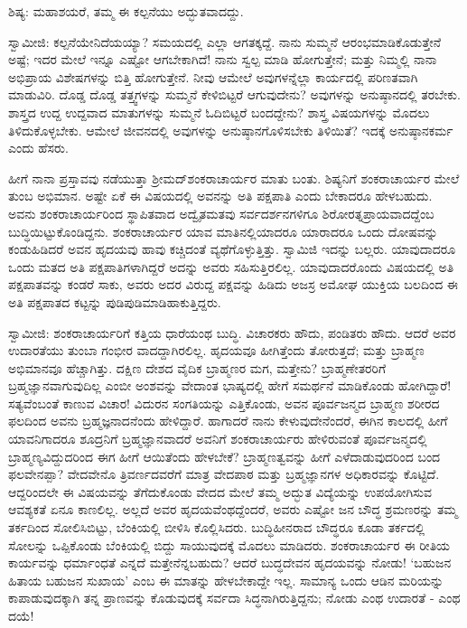ಶಿಷ್ಯ: ಮಹಾಶಯರೆ, ತಮ್ಮ ಈ ಕಲ್ಪನೆಯು ಅದ್ಭುತವಾದದ್ದು.

ಸ್ವಾಮೀಜಿ: ಕಲ್ಪನೆಯೇನಿದೆಯಯ್ಯಾ? ಸಮಯದಲ್ಲಿ ಎಲ್ಲಾ ಆಗತಕ್ಕದ್ದೆ. ನಾನು ಸುಮ್ಮನೆ ಆರಂಭಮಾಡಿಕೊಡುತ್ತೇನೆ ಅಷ್ಟೆ; ಇದರ ಮೇಲೆ ಇನ್ನೂ ಎಷ್ಟೋ ಆಗಬೇಕಾಗಿದೆ! ನಾನು ಸ್ವಲ್ಪ ಮಾಡಿ ಹೋಗುತ್ತೇನೆ; ಮತ್ತು ನಿಮ್ಮಲ್ಲಿ ನಾನಾ ಅಭಿಪ್ರಾಯ ವಿಶೇಷಗಳನ್ನು ಬಿತ್ತಿ ಹೋಗುತ್ತೇನೆ. ನೀವು ಆಮೇಲೆ ಅವುಗಳನ್ನೆಲ್ಲಾ ಕಾರ್ಯದಲ್ಲಿ ಪರಿಣತವಾಗಿ ಮಾಡುವಿರಿ. ದೊಡ್ಡ ದೊಡ್ಡ ತತ್ತ್ವಗಳನ್ನು ಸುಮ್ಮನೆ ಕೇಳಿಬಿಟ್ಟರೆ ಆಗುವುದೇನು? ಅವುಗಳನ್ನು ಅನುಷ್ಠಾನದಲ್ಲಿ ತರಬೇಕು. ಶಾಸ್ತ್ರದ ಉದ್ದ ಉದ್ದವಾದ ಮಾತುಗಳನ್ನು ಸುಮ್ಮನೆ ಓದಿಬಿಟ್ಟರೆ ಬಂದದ್ದೇನು? ಶಾಸ್ತ್ರ ವಿಷಯಗಳನ್ನು ಮೊದಲು ತಿಳಿದುಕೊಳ್ಳಬೇಕು. ಆಮೇಲೆ ಜೀವನದಲ್ಲಿ ಅವುಗಳನ್ನು ಅನುಷ್ಠಾನಗೊಳಿಸಬೇಕು ತಿಳಿಯಿತೆ? ಇದಕ್ಕೆ ಅನುಷ್ಠಾನಕರ್ಮ ಎಂದು ಹೆಸರು.

ಹೀಗೆ ನಾನಾ ಪ್ರಸ್ತಾವವು ನಡೆಯುತ್ತಾ ಶ‍್ರೀಮದ್‌ಶಂಕರಾಚಾರ್ಯರ ಮಾತು ಬಂತು. ಶಿಷ್ಯನಿಗೆ ಶಂಕರಾಚಾರ್ಯರ ಮೇಲೆ ತುಂಬ ಅಭಿಮಾನ. ಅಷ್ಟೇ ಏಕೆ ಈ ವಿಷಯದಲ್ಲಿ ಅವನನ್ನು ಅತಿ ಪಕ್ಷಪಾತಿ ಎಂದು ಬೇಕಾದರೂ ಹೇಳಬಹುದು. ಅವನು ಶಂಕರಾಚಾರ್ಯರಿಂದ ಸ್ಥಾಪಿತವಾದ ಅದ್ವೈತಮತವು ಸರ್ವದರ್ಶನಗಳಿಗೂ ಶಿರೋರತ್ನಪ್ರಾಯವಾದದ್ದೆಂಬ ಬುದ್ಧಿಯಿಟ್ಟುಕೊಂಡಿದ್ದನು. ಶಂಕರಾಚಾರ್ಯರ ಯಾವ ಮಾತಿನಲ್ಲಿಯಾದರೂ ಯಾರಾದರೂ ಒಂದು ದೋಷವನ್ನು ಕಂಡುಹಿಡಿದರೆ ಅವನ ಹೃದಯವು ಹಾವು ಕಚ್ಚಿದಂತೆ ವ್ಯಥೆಗೊಳ್ಳುತ್ತಿತ್ತು. ಸ್ವಾಮಿಜಿ ಇದನ್ನು ಬಲ್ಲರು. ಯಾವುದಾದರೂ ಒಂದು ಮತದ ಅತಿ ಪಕ್ಷಪಾತಿಗಳಾಗಿದ್ದರೆ ಅದನ್ನು ಅವರು ಸಹಿಸುತ್ತಿರಲಿಲ್ಲ. ಯಾವುದಾದರೊಂದು ವಿಷಯದಲ್ಲಿ ಅತಿ ಪಕ್ಷಪಾತವನ್ನು ಕಂಡರೆ ಸಾಕು, ಅವರು ಅದರ ವಿರುದ್ದ ಪಕ್ಷವನ್ನು ಹಿಡಿದು ಅಜಸ್ರ ಅಮೋಘ ಯುಕ್ತಿಯ ಬಲದಿಂದ ಈ ಅತಿ ಪಕ್ಷಪಾತದ ಕಟ್ಟನ್ನು ಪುಡಿಪುಡಿಮಾಡಿಹಾಕುತ್ತಿದ್ದರು.

ಸ್ವಾಮೀಜಿ: ಶಂಕರಾಚಾರ್ಯರಿಗೆ ಕತ್ತಿಯ ಧಾರೆಯಂಥ ಬುದ್ಧಿ. ವಿಚಾರಕರು ಹೌದು, ಪಂಡಿತರು ಹೌದು. ಆದರೆ ಅವರ ಉದಾರತೆಯು ತುಂಬಾ ಗಂಭೀರ ವಾದದ್ದಾಗಿರಲಿಲ್ಲ. ಹೃದಯವೂ ಹೀಗಿತ್ತೆಂದು ತೋರುತ್ತದೆ; ಮತ್ತು ಬ್ರಾಹ್ಮಣ ಅಭಿಮಾನವೂ ಹೆಚ್ಚಾಗಿತ್ತು. ದಕ್ಷಿಣ ದೇಶದ ವೈದಿಕ ಬ್ರಾಹ್ಮಣರ ಮಗ, ಮತ್ತೇನು? ಬ್ರಾಹ್ಮಣೇತರರಿಗೆ ಬ್ರಹ್ಮಜ್ಞಾನವಾಗುವುದಿಲ್ಲ ಎಂಬೀ ಅಂಶವನ್ನು ವೇದಾಂತ ಭಾಷ್ಯದಲ್ಲಿ ಹೇಗೆ ಸಮರ್ಥನೆ ಮಾಡಿಕೊಂಡು ಹೋಗಿದ್ದಾರೆ! ಸತ್ಯವೆಂಬಂತೆ ಕಾಣುವ ವಿಚಾರ! ವಿದುರನ ಸಂಗತಿಯನ್ನು ಎತ್ತಿಕೊಂಡು, ಅವನ ಪೂರ್ವಜನ್ಮದ ಬ್ರಾಹ್ಮಣ ಶರೀರದ ಫಲದಿಂದ ಅವನು ಬ್ರಹ್ಮಜ್ಞನಾದನೆಂದು ಹೇಳಿದ್ದಾರೆ. ಹಾಗಾದರೆ ನಾನು ಕೇಳುವುದೇನೆಂದರೆ, ಈಗಿನ ಕಾಲದಲ್ಲಿ ಹೀಗೆ ಯಾವನಿಗಾದರೂ ಶೂದ್ರನಿಗೆ ಬ್ರಹ್ಮಜ್ಞಾನವಾದರೆ ಅವನಿಗೆ ಶಂಕರಾಚಾರ್ಯರು ಹೇಳಿರುವಂತೆ ಪೂರ್ವಜನ್ಮದಲ್ಲಿ ಬ್ರಾಹ್ಮಣ್ಯವಿದ್ದುದರಿಂದ ಈಗ ಹೀಗೆ ಆಯಿತೆಂದು ಹೇಳಬೇಕೆ? ಬ್ರಾಹ್ಮಣತ್ವವನ್ನು ಹೀಗೆ ಎಳೆದಾಡುವುದರಿಂದ ಬಂದ ಫಲವೇನಪ್ಪಾ? ವೇದವೇನೊ ತ್ರಿವರ್ಣದವರೆಗೆ ಮಾತ್ರ ವೇದಪಾಠ ಮತ್ತು ಬ್ರಹ್ಮಜ್ಞಾನಗಳ ಅಧಿಕಾರವನ್ನು ಕೊಟ್ಟಿದೆ. ಆದ್ದರಿಂದಲೇ ಈ ವಿಷಯವನ್ನು ತೆಗೆದುಕೊಂಡು ವೇದದ ಮೇಲೆ ತಮ್ಮ ಅದ್ಭುತ ವಿದ್ಯೆಯನ್ನು ಉಪಯೋಗಿಸುವ ಆವಶ್ಯಕತೆ ಏನೂ ಕಾಣಲಿಲ್ಲ. ಅಲ್ಲದೆ ಅವರ ಹೃದಯವೆಂಥದ್ದೆಂದರೆ, ಅವರು ಎಷ್ಟೋ ಜನ ಬೌದ್ಧ ಶ್ರಮಣರನ್ನು ತಮ್ಮ ತರ್ಕದಿಂದ ಸೋಲಿಸಿಬಿಟ್ಟು, ಬೆಂಕಿಯಲ್ಲಿ ಬೀಳಿಸಿ ಕೊಲ್ಲಿಸಿದರು. ಬುದ್ಧಿಹೀನರಾದ ಬೌದ್ಧರೂ ಕೂಡಾ ತರ್ಕದಲ್ಲಿ ಸೋಲನ್ನು ಒಪ್ಪಿಕೊಂಡು ಬೆಂಕಿಯಲ್ಲಿ ಬಿದ್ದು ಸಾಯುವುದಕ್ಕೆ ಮೊದಲು ಮಾಡಿದರು. ಶಂಕರಾಚಾರ್ಯರ ಈ ರೀತಿಯ ಕಾರ್ಯವನ್ನು ಧರ್ಮಾಂಧತೆ ಎನ್ನದೆ ಮತ್ತೇನೆನ್ನಬಹುದು? ಆದರೆ ಬುದ್ಧದೇವನ ಹೃದಯವನ್ನು ನೋಡು! ‘ಬಹುಜನ ಹಿತಾಯ ಬಹುಜನ ಸುಖಾಯ’ ಎಂಬ ಈ ಮಾತನ್ನು ಹೇಳಬೇಕಾದ್ದೇ ಇಲ್ಲ. ಸಾಮಾನ್ಯ ಒಂದು ಆಡಿನ ಮರಿಯನ್ನು ಕಾಪಾಡುವುದಕ್ಕಾಗಿ ತನ್ನ ಪ್ರಾಣವನ್ನು ಕೊಡುವುದಕ್ಕೆ ಸರ್ವದಾ ಸಿದ್ಧನಾಗಿರುತ್ತಿದ್ದನು; ನೋಡು ಎಂಥ ಉದಾರತೆ - ಎಂಥ ದಯೆ!

